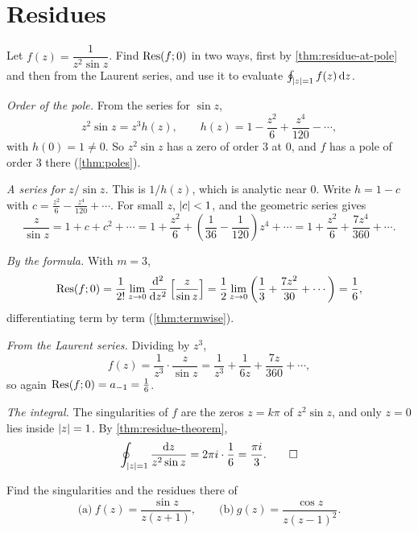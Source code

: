 \section{Residues}\label{sec:residues}




\begin{exercise}\label{ex:z-squared-sin}
  Let $f(z) = \dfrac{1}{z^2 \sin z}$. Find $\operatorname{Res}(f; 0)$ in two ways, first by
  \cref{thm:residue-at-pole} and then from the Laurent series, and use it to
  evaluate $\oint_{\lvert z\rvert = 1} f(z) \mathop{}\!\mathrm{d} z$.
\end{exercise}

\begin{solution}
  \emph{Order of the pole.} From the series for $\sin z$,
  \[
    z^2 \sin z = z^3 h(z),
    \qquad h(z) = 1 - \frac{z^2}{6} + \frac{z^4}{120} - \dotsb,
  \]
  with $h(0) = 1 \neq 0$. So $z^2 \sin z$ has a zero of order $3$ at $0$, and
  $f$ has a pole of order $3$ there (\cref{thm:poles}).

  \emph{A series for $z / \sin z$.} This is $1/h(z)$, which is analytic near
  $0$. Write $h = 1 - c$ with $c = \frac{z^2}{6} - \frac{z^4}{120} + \dotsb$.
  For small $z$, $\lvert c\rvert < 1$, and the geometric series gives
  \[
    \frac{z}{\sin z} = 1 + c + c^2 + \dotsb
    = 1 + \frac{z^2}{6} + \left(\frac{1}{36} - \frac{1}{120}\right) z^4 + \dotsb
    = 1 + \frac{z^2}{6} + \frac{7 z^4}{360} + \dotsb.
  \]

  \emph{By the formula.} With $m = 3$,
  \[
    \operatorname{Res}(f; 0)
    = \frac{1}{2!} \lim_{z \to 0} \frac{\mathop{}\!\mathrm{d}^2}{\mathop{}\!\mathrm{d} z^2} \left[ \frac{z}{\sin z} \right]
    = \frac12 \lim_{z \to 0} \left( \frac13 + \frac{7 z^2}{30} + \dotsb \right)
    = \frac16,
  \]
  differentiating term by term (\cref{thm:termwise}).

  \emph{From the Laurent series.} Dividing by $z^3$,
  \[
    f(z) = \frac{1}{z^3} \cdot \frac{z}{\sin z}
    = \frac{1}{z^3} + \frac{1}{6z} + \frac{7z}{360} + \dotsb,
  \]
  so again $\operatorname{Res}(f; 0) = a_{-1} = \frac16$.

  \emph{The integral.} The singularities of $f$ are the zeros $z = k\pi$ of
  $z^2 \sin z$, and only $z = 0$ lies inside $\lvert z\rvert = 1$. By
  \cref{thm:residue-theorem},
  \[
    \oint_{\lvert z\rvert = 1} \frac{\mathop{}\!\mathrm{d} z}{z^2 \sin z}
    = 2\pi i \cdot \frac16 = \frac{\pi i}{3}. \qedhere
  \]
\end{solution}

\begin{exercise}\label{ex:residues-two-functions}
  Find the singularities and the residues there of
  \[
    \text{(a)}\ f(z) = \frac{\sin z}{z(z + 1)},
    \qquad
    \text{(b)}\ g(z) = \frac{\cos z}{z (z - 1)^2}.
  \]
\end{exercise}

